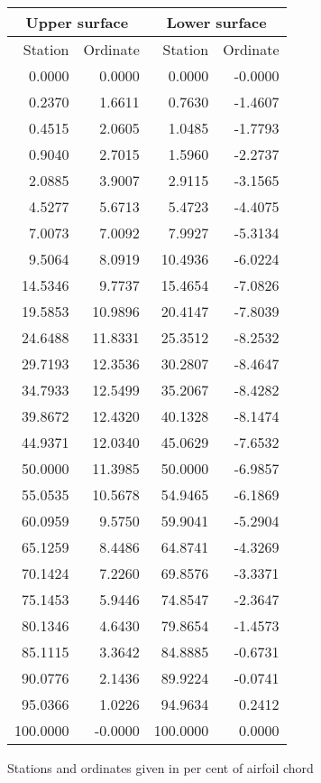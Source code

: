\documentclass[11pt]{book}
\begin{document}
 \hspace{4mm}
 \begin{tabular}{|r|r|r|r|} \hline 
 \multicolumn{2}{|c|}{Upper surface} & \multicolumn{2}{|c|}{Lower surface} \\
 \hline
 Station & Ordinate & Station & Ordinate \\
 \hline
0.0000 & 0.0000 & 0.0000 & -0.0000 \\
0.2370 & 1.6611 & 0.7630 & -1.4607 \\
0.4515 & 2.0605 & 1.0485 & -1.7793 \\
0.9040 & 2.7015 & 1.5960 & -2.2737 \\
2.0885 & 3.9007 & 2.9115 & -3.1565 \\
4.5277 & 5.6713 & 5.4723 & -4.4075 \\
7.0073 & 7.0092 & 7.9927 & -5.3134 \\
9.5064 & 8.0919 & 10.4936 & -6.0224 \\
14.5346 & 9.7737 & 15.4654 & -7.0826 \\
19.5853 & 10.9896 & 20.4147 & -7.8039 \\
24.6488 & 11.8331 & 25.3512 & -8.2532 \\
29.7193 & 12.3536 & 30.2807 & -8.4647 \\
34.7933 & 12.5499 & 35.2067 & -8.4282 \\
39.8672 & 12.4320 & 40.1328 & -8.1474 \\
44.9371 & 12.0340 & 45.0629 & -7.6532 \\
50.0000 & 11.3985 & 50.0000 & -6.9857 \\
55.0535 & 10.5678 & 54.9465 & -6.1869 \\
60.0959 & 9.5750 & 59.9041 & -5.2904 \\
65.1259 & 8.4486 & 64.8741 & -4.3269 \\
70.1424 & 7.2260 & 69.8576 & -3.3371 \\
75.1453 & 5.9446 & 74.8547 & -2.3647 \\
80.1346 & 4.6430 & 79.8654 & -1.4573 \\
85.1115 & 3.3642 & 84.8885 & -0.6731 \\
90.0776 & 2.1436 & 89.9224 & -0.0741 \\
95.0366 & 1.0226 & 94.9634 & 0.2412 \\
100.0000 & -0.0000 & 100.0000 & 0.0000 \\
 \hline 
 \end{tabular}
 \vspace{8mm}

Stations and ordinates given in per cent of airfoil chord
\end{document}
